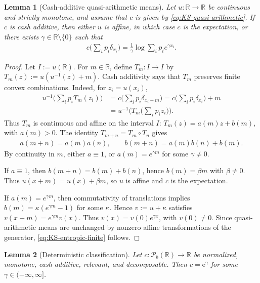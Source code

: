 \documentclass[a4paper]{amsart}
\newtheorem{lemma}[lemma]{Lemma}
\theoremstyle{definition}
\newcommand{\R}{\mathbb{R}}
\newcommand{\Pc}{\mathcal P}
\begin{document}
\begin{lemma}[Cash-additive quasi-arithmetic means]
\label{lem:KS-cash-additive-quasi-arithmetic}
Let \(u:\R\to\R\) be continuous and strictly monotone, and assume that
\(c\) is given by \eqref{eq:KS-quasi-arithmetic}. If \(c\) is cash additive,
then either \(u\) is affine, in which case \(c\) is the expectation, or there
exists \(\gamma\in\R\setminus\{0\}\) such that
\begin{align}
c\Big(\sum_i p_i\delta_{x_i}\Big)
=
\frac1\gamma\log\sum_i p_i e^{\gamma x_i}.
\label{eq:KS-entropic-finite}
\end{align}
\end{lemma}

\begin{proof}
Let \(I:=u(\R)\). For \(m\in\R\), define
\(T_m:I\to I\) by \(T_m(z):=u(u^{-1}(z)+m)\). Cash additivity says that
\(T_m\) preserves finite convex combinations. Indeed, for \(z_i=u(x_i)\),
\begin{align}
u^{-1}\Big(\sum_i p_iT_m(z_i)\Big)
&=
c\Big(\sum_i p_i\delta_{x_i+m}\Big)
=
c\Big(\sum_i p_i\delta_{x_i}\Big)+m
\nonumber\\
&=
u^{-1}\Big(T_m\big(\sum_i p_iz_i\big)\Big).
\label{eq:KS-Tm-affine-reason}
\end{align}
Thus \(T_m\) is continuous and affine on the interval \(I\):
\(T_m(z)=a(m)z+b(m)\), with \(a(m)>0\). The identity
\(T_{m+n}=T_m\circ T_n\) gives
\begin{align}
a(m+n)=a(m)a(n),
\qquad
b(m+n)=a(m)b(n)+b(m).
\label{eq:KS-affine-cocycle}
\end{align}
By continuity in \(m\), either \(a\equiv1\), or \(a(m)=e^{\gamma m}\) for
some \(\gamma\ne0\).

If \(a\equiv1\), then \(b(m+n)=b(m)+b(n)\), hence \(b(m)=\beta m\) with
\(\beta\ne0\). Thus \(u(x+m)=u(x)+\beta m\), so \(u\) is affine and \(c\) is
the expectation.

If \(a(m)=e^{\gamma m}\), then commutativity of translations implies
\(b(m)=\kappa(e^{\gamma m}-1)\) for some \(\kappa\). Hence \(v:=u+\kappa\)
satisfies \(v(x+m)=e^{\gamma m}v(x)\). Thus \(v(x)=v(0)e^{\gamma x}\), with
\(v(0)\ne0\). Since quasi-arithmetic means are unchanged by nonzero affine
transformations of the generator, \eqref{eq:KS-entropic-finite} follows.
\end{proof}

\begin{lemma}[Deterministic classification]
\label{lem:KS-deterministic-classification}
Let \(c:\Pc_b(\R)\to\R\) be normalized, monotone, cash additive, relevant, and
decomposable. Then \(c=\mathrm e^\gamma\) for some
\(\gamma\in(-\infty,\infty]\).
\end{lemma}
\end{document}
